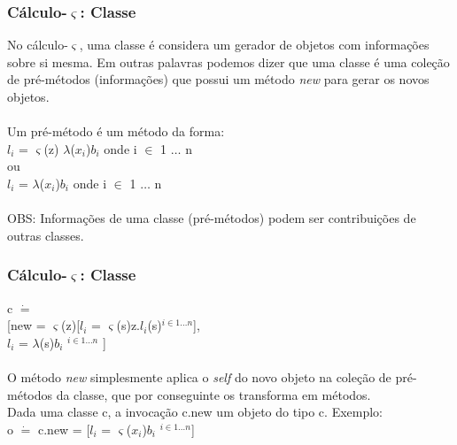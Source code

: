 \documentclass[10pt, compress]{beamer}
\begin{document}
\begin{frame}[fragile]
  \frametitle{Cálculo-$\varsigma$: Classe}
  No cálculo-$\varsigma$, uma classe é considera um gerador de objetos com informações sobre si mesma.
  Em outras palavras podemos dizer que uma classe é uma coleção de pré-métodos (informações) que possui um
  método \textit{new} para gerar os novos objetos.
  \\~\\
  Um pré-método é um método da forma:
  \\
  \hspace{1cm} $l_{i}$ = $\varsigma$(z) $\lambda$($x_{i}$)$b_{i}$ onde i $\in$ 1 $\ldots$ n
  \\
  ou
  \\
  \hspace{1cm} $l_{i}$ = $\lambda$($x_{i}$)$b_{i}$ onde i $\in$ 1 $\ldots$ n
  \\~\\
  OBS:  Informações de uma classe (pré-métodos) podem ser contribuições de outras classes.
\end{frame}

\begin{frame}[fragile]
  \frametitle{Cálculo-$\varsigma$: Classe}
  c $\dot{=}$
  \\
  \hspace{0.5cm}[\hspace{0.5cm}new = $\varsigma$(z)[$l_{i}$ = $\varsigma$(s)z.$l_{i}$(s)$^{i \in 1 \ldots n}$],
  \\
  \hspace{1cm} $l_{i}$ = $\lambda$(s)$b_{i}$ $^{i \in 1 \ldots n}$ ]
  \\~\\
  O método \textit{new} simplesmente aplica o \textit{self} do novo objeto na coleção de pré-métodos da classe, que por
  conseguinte os transforma em métodos.
  \\
  Dada uma classe c, a invocação c.new um objeto do tipo c. Exemplo:
  \\
  \hspace{1cm} o $\dot{=}$ c.new = [$l_{i}$ = $\varsigma$($x_{i}$)$b_{i}$ $^{i \in 1 \ldots n}$]
\end{frame}
\end{document}
